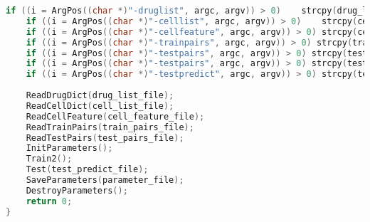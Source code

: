 \documentclass{article}
\begin{document}
\begin{lstlisting}[language=c++]
    if ((i = ArgPos((char *)"-druglist", argc, argv)) > 0)    strcpy(drug_list_file, argv[i + 1]);
    if ((i = ArgPos((char *)"-celllist", argc, argv)) > 0)    strcpy(cell_list_file, argv[i + 1]);
    if ((i = ArgPos((char *)"-cellfeature", argc, argv)) > 0) strcpy(cell_feature_file, argv[i + 1]);
    if ((i = ArgPos((char *)"-trainpairs", argc, argv)) > 0) strcpy(train_pairs_file, argv[i + 1]);
    if ((i = ArgPos((char *)"-testpairs", argc, argv)) > 0) strcpy(test_pairs_file, argv[i + 1]);
    if ((i = ArgPos((char *)"-testpairs", argc, argv)) > 0) strcpy(test_pairs_file, argv[i + 1]);
    if ((i = ArgPos((char *)"-testpredict", argc, argv)) > 0) strcpy(test_predict_file, argv[i + 1]);
               
    ReadDrugDict(drug_list_file);
    ReadCellDict(cell_list_file);
    ReadCellFeature(cell_feature_file);
    ReadTrainPairs(train_pairs_file);
    ReadTestPairs(test_pairs_file);
    InitParameters();
    Train2();
    Test(test_predict_file);
    SaveParameters(parameter_file);
    DestroyParameters();
    return 0;
}
\end{lstlisting}








\end{document}
